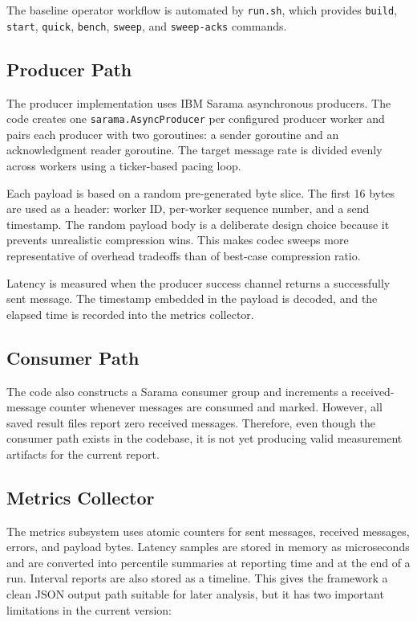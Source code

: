 \documentclass[conference]{IEEEtran}
\begin{document}
The baseline operator workflow is automated by \texttt{run.sh}, which provides \texttt{build}, \texttt{start}, \texttt{quick}, \texttt{bench}, \texttt{sweep}, and \texttt{sweep-acks} commands.

\subsection{Producer Path}
The producer implementation uses IBM Sarama asynchronous producers. The code creates one \texttt{sarama.AsyncProducer} per configured producer worker and pairs each producer with two goroutines: a sender goroutine and an acknowledgment reader goroutine. The target message rate is divided evenly across workers using a ticker-based pacing loop.

Each payload is based on a random pre-generated byte slice. The first 16 bytes are used as a header: worker ID, per-worker sequence number, and a send timestamp. The random payload body is a deliberate design choice because it prevents unrealistic compression wins. This makes codec sweeps more representative of overhead tradeoffs than of best-case compression ratio.

Latency is measured when the producer success channel returns a successfully sent message. The timestamp embedded in the payload is decoded, and the elapsed time is recorded into the metrics collector.

\subsection{Consumer Path}
The code also constructs a Sarama consumer group and increments a received-message counter whenever messages are consumed and marked. However, all saved result files report zero received messages. Therefore, even though the consumer path exists in the codebase, it is not yet producing valid measurement artifacts for the current report.

\subsection{Metrics Collector}
The metrics subsystem uses atomic counters for sent messages, received messages, errors, and payload bytes. Latency samples are stored in memory as microseconds and are converted into percentile summaries at reporting time and at the end of a run. Interval reports are also stored as a timeline. This gives the framework a clean JSON output path suitable for later analysis, but it has two important limitations in the current version:
\end{document}
